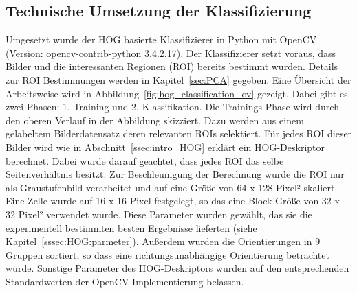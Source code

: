 \subsection{Technische Umsetzung der Klassifizierung} \label{ssec:implementation}
Umgesetzt wurde der HOG basierte Klassifizierer in Python mit OpenCV (Version: opencv-contrib-python 3.4.2.17). Der Klassifizierer setzt voraus, dass Bilder und die interessanten Regionen (ROI) bereits bestimmt wurden. Details zur ROI Bestimmungen werden in Kapitel~\ref{sec:PCA} gegeben. Eine Übersicht der Arbeitsweise wird in Abbildung~\ref{fig:hog_classification_ov} gezeigt. Dabei gibt es zwei Phasen: 1. Training und 2. Klassifikation. Die Trainings Phase wird durch den oberen Verlauf in der Abbildung skizziert. Dazu werden aus einem gelabeltem Bilderdatensatz deren relevanten ROIs selektiert. Für jedes ROI dieser Bilder wird wie in Abschnitt~\ref{ssec:intro_HOG} erklärt ein HOG-Deskriptor berechnet. Dabei wurde darauf geachtet, dass jedes ROI das selbe Seitenverhältnis besitzt. Zur Beschleunigung der Berechnung wurde die ROI nur als Graustufenbild verarbeitet und auf eine Größe von 64 x 128 Pixel² skaliert. Eine Zelle wurde auf 16 x 16 Pixel festgelegt, so das eine Block Größe von 32 x 32 Pixel² verwendet wurde. Diese Parameter wurden gewählt, das sie die experimentell bestimmten besten Ergebnisse lieferten (siehe Kapitel~\ref{sssec:HOG:parmeter}). Außerdem wurden die Orientierungen in 9 Gruppen sortiert, so dass eine richtungsunabhängige Orientierung betrachtet wurde. Sonstige Parameter des HOG-Deskriptors wurden auf den entsprechenden Standardwerten der OpenCV Implementierung belassen. 

